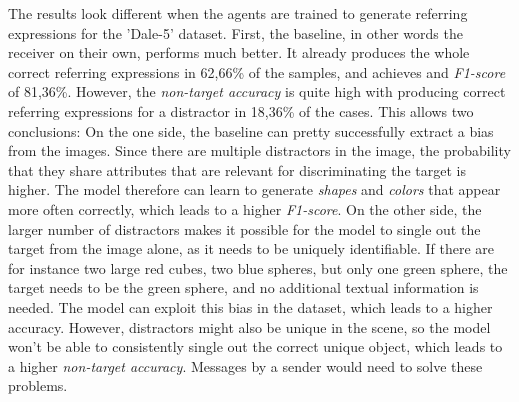 The results look different when the agents are trained to generate referring expressions for the 'Dale-5' dataset.
First, the baseline, in other words the receiver on their own, performs much better.
It already produces the whole correct referring expressions in 62,66\% of the samples, and achieves and \emph{F1-score} of 81,36\%.
However, the \emph{non-target accuracy} is quite high with producing correct referring expressions for a distractor in 18,36\% of the cases.
This allows two conclusions: On the one side, the baseline can pretty successfully extract a bias from the images.
Since there are multiple distractors in the image, the probability that they share attributes that are relevant for discriminating the target is higher.
The model therefore can learn to generate \emph{shapes} and \emph{colors} that appear more often correctly, which leads to a higher \emph{F1-score}.
On the other side, the larger number of distractors makes it possible for the model to single out the target from the image alone, as it needs to be uniquely identifiable.
If there are for instance two large red cubes, two blue spheres, but only one green sphere, the target needs to be the green sphere, and no additional textual information is needed.
The model can exploit this bias in the dataset, which leads to a higher accuracy.
However, distractors might also be unique in the scene, so the model won't be able to consistently single out the correct unique object, which leads to a higher \emph{non-target accuracy}.
Messages by a sender would need to solve these problems.

